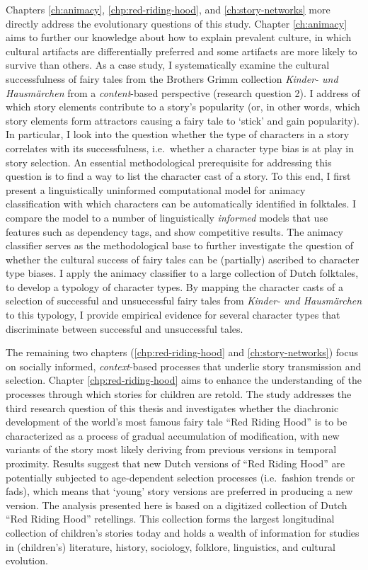 Chapters \ref{ch:animacy}, \ref{chp:red-riding-hood}, and \ref{ch:story-networks} more directly address the evolutionary questions of this study. Chapter \ref{ch:animacy} aims to further our knowledge about how to explain prevalent culture, in which cultural artifacts are differentially preferred and some artifacts are more likely to survive than others. As a case study, I systematically examine the cultural successfulness of fairy tales from the Brothers Grimm collection \emph{Kinder- und Hausmärchen} from a \emph{content}-based perspective (research question 2). I address of which story elements contribute to a story's popularity (or, in other words, which story elements form attractors causing a fairy tale to `stick' and gain popularity). In particular, I look into the question whether the type of characters in a story correlates with its successfulness, i.e.\ whether a character type bias is at play in story selection. An essential methodological prerequisite for addressing this question is to find a way to list the character cast of a story. To this end, I first present a linguistically uninformed computational model for animacy classification with which characters can be automatically identified in folktales. I compare the model to a number of linguistically \emph{informed} models that use features such as dependency tags, and show competitive results. The animacy classifier serves as the methodological base to further investigate the question of whether the cultural success of fairy tales can be (partially) ascribed to character type biases. I apply the animacy classifier to a large collection of Dutch folktales, to develop a typology of character types. By mapping the character casts of a selection of successful and unsuccessful fairy tales from \emph{Kinder- und Hausmärchen} to this typology, I provide empirical evidence for several character types that discriminate between successful and unsuccessful tales.

The remaining two chapters (\ref{chp:red-riding-hood} and \ref{ch:story-networks}) focus on socially informed, \emph{context}-based processes that underlie story transmission and selection. Chapter \ref{chp:red-riding-hood} aims to enhance the understanding of the processes through which stories for children are retold. The study addresses the third research question of this thesis and investigates whether the diachronic development of the world's most famous fairy tale ``Red Riding Hood'' is to be characterized as a process of gradual accumulation of modification, with new variants of the story most likely deriving from previous versions in temporal proximity. Results suggest that new Dutch versions of ``Red Riding Hood'' are potentially subjected to age-dependent selection processes (i.e.\ fashion trends or fads), which means that `young' story versions are preferred in producing a new version. The analysis presented here is based on a digitized collection of Dutch ``Red Riding Hood'' retellings\autocite{folgert_karsdorp_2016_51588}. This collection forms the largest longitudinal collection of children's stories today and holds a wealth of information for studies in (children's) literature, history, sociology, folklore, linguistics, and cultural evolution. 

